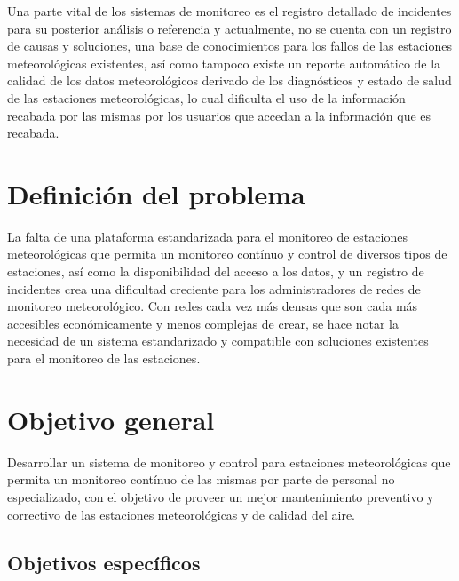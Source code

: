 Una parte vital de los sistemas de monitoreo es el registro detallado de incidentes para su posterior análisis o referencia y actualmente, no se cuenta con un registro de causas y soluciones, una base de conocimientos para los fallos de las estaciones meteorológicas existentes, así como tampoco existe un reporte automático de la calidad de los datos meteorológicos derivado de los diagnósticos y estado de salud de las estaciones meteorológicas, lo cual dificulta el uso de la información recabada por las mismas por los usuarios que accedan a la información que es recabada.


\section{Definición del problema}

La falta de una plataforma estandarizada para el monitoreo de estaciones meteorológicas que permita un monitoreo contínuo y control de diversos tipos de estaciones, así como la disponibilidad del acceso a los datos, y un registro de incidentes crea una dificultad creciente para los administradores de redes de monitoreo meteorológico. Con redes cada vez más densas que son cada más accesibles económicamente y menos complejas de crear, se hace notar la necesidad de un sistema estandarizado y compatible con soluciones existentes para el monitoreo de las estaciones.



\section{Objetivo general}

Desarrollar un sistema de monitoreo y control para estaciones meteorológicas que permita un monitoreo contínuo de las mismas por parte de personal no especializado, con el objetivo de proveer un mejor mantenimiento preventivo y correctivo de las estaciones meteorológicas y de calidad del aire.



\subsection{Objetivos específicos}

